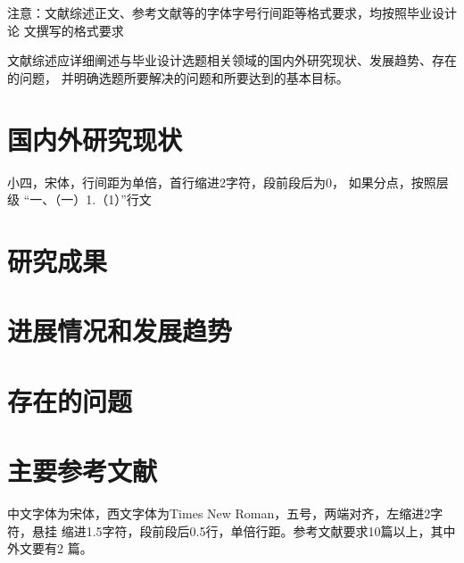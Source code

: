 \begin{tcolorbox}
    注意：文献综述正文、参考文献等的字体字号行间距等格式要求，均按照毕业设计论
    文撰写的格式要求
\end{tcolorbox}

文献综述应详细阐述与毕业设计选题相关领域的国内外研究现状、发展趋势、存在的问题，
并明确选题所要解决的问题和所要达到的基本目标。

\section{国内外研究现状}

\begin{tcolorbox}
    小四，宋体，行间距为单倍，首行缩进2字符，段前段后为0， 如果分点，按照层级
    “一、（一）1.（1）”行文
\end{tcolorbox}
    
\lipsum[1]\cite{Bohan1928,chen1980zhongguo}

\section{研究成果}

\lipsum[2-4]\cite{chen2005zhulu,chu2004tushu,yuan2012lanc}

\section{进展情况和发展趋势}

\lipsum[5-7]\cite{lamport1986document,niu2013zonghe}

\section{存在的问题}

\lipsum[8-11]\cite{wikibook2014latex,Dubrovin1906,hls2012jinji}

\section{主要参考文献}

\begin{tcolorbox}
    中文字体为宋体，西文字体为Times New Roman，五号，两端对齐，左缩进2字符，悬挂
    缩进1.5字符，段前段后0.5行，单倍行距。参考文献要求10篇以上，其中外文要有2
    篇。
\end{tcolorbox}

